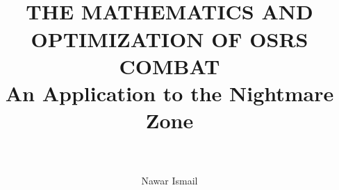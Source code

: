 \documentclass[12pt,a4paper]{article}
\author{Nawar Ismail}
\title{
	\HRule{0.5pt}\\
	\LARGE \textbf{\uppercase{The Mathematics and Optimization of OSRS Combat}}\\
	An Application to the Nightmare Zone\\
	\HRule{2pt}\\
}
\begin{document}
\begin{titlepage}
	\maketitle
\end{titlepage}
\end{document}
